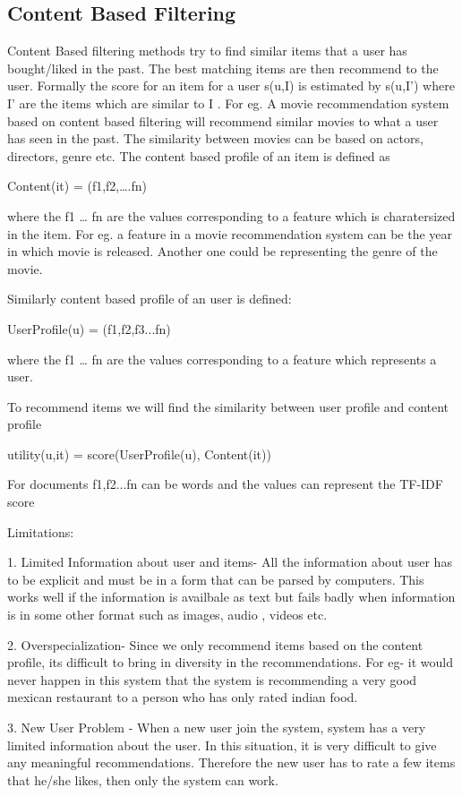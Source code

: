 \subsection{Content Based Filtering}

Content Based filtering methods try to find similar items that a user has bought/liked in the past. The best matching items are then recommend to the user. Formally the score for an item for a user s(u,I) is estimated by s(u,I') where I' are the items which are similar to I . For eg. A movie recommendation system based on content based filtering will recommend similar movies to what a user has seen in the past. The similarity between movies can be based on actors, directors, genre etc. The content based profile of an item is defined as

Content(it) = (f1,f2,….fn)

where the f1 … fn are the values corresponding to a feature which is charatersized in the item. For eg. a feature in a movie recommendation system can be the year in which movie is released. Another one could be representing the genre of the movie.

Similarly content based profile of an user is defined:

UserProfile(u) = (f1,f2,f3...fn)

where the f1 … fn are the values corresponding to a feature which represents a user.

To recommend items we will find the similarity between user profile and content profile

utility(u,it) = score(UserProfile(u), Content(it))

For documents f1,f2...fn can be words and the values can represent the TF-IDF score

Limitations:

1. Limited Information about user and items- All the information about user has to be explicit and must be in a form that can be parsed by computers. This works well if the information is availbale as text but fails badly when information is in some other format such as images, audio , videos etc.

2. Overspecialization- Since we only recommend items based on the content profile, its difficult to bring in diversity in the recommendations. For eg- it would never happen in this system that the system is recommending a very good mexican restaurant to a person who has only rated indian food.

3. New User Problem - When a new user join the system, system has a very limited information about the user. In this situation, it is very difficult to give any meaningful recommendations. Therefore the new user has to rate a few items that he/she likes, then only the system can work. 
